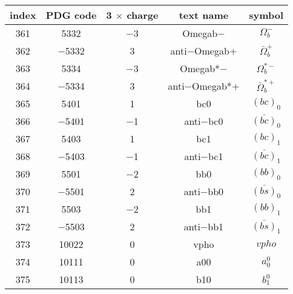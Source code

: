 \documentclass{article}
\begin{document}
\begin{table}[!htbp]
\centering
\begin{tabular}{|c|c|c|c|c|}
\hline
index & PDG code & 3 $\times$ charge & text name & symbol \\
\hline
361 & 5332 & $-$3 & Omega\underline{\hspace{0.6em}}b$-$ & $\Omega_{b}^{-}$ \\
\hline
362 & $-$5332 & 3 & anti$-$Omega\underline{\hspace{0.6em}}b$+$ & $\bar{\Omega}_{b}^{+}$ \\
\hline
363 & 5334 & $-$3 & Omega\underline{\hspace{0.6em}}b*$-$ & $\Omega_{b}^{*-}$ \\
\hline
364 & $-$5334 & 3 & anti$-$Omega\underline{\hspace{0.6em}}b*$+$ & $\bar{\Omega}_{b}^{*+}$ \\
\hline
365 & 5401 & 1 & bc\underline{\hspace{0.6em}}0 & $(bc)_{0}$ \\
\hline
366 & $-$5401 & $-$1 & anti$-$bc\underline{\hspace{0.6em}}0 & $\bar{(bc)}_{0}$ \\
\hline
367 & 5403 & 1 & bc\underline{\hspace{0.6em}}1 & $(bc)_{1}$ \\
\hline
368 & $-$5403 & $-$1 & anti$-$bc\underline{\hspace{0.6em}}1 & $\bar{(bc)}_{1}$ \\
\hline
369 & 5501 & $-$2 & bb\underline{\hspace{0.6em}}0 & $(bb)_{0}$ \\
\hline
370 & $-$5501 & 2 & anti$-$bb\underline{\hspace{0.6em}}0 & $\bar{(bs)}_{0}$ \\
\hline
371 & 5503 & $-$2 & bb\underline{\hspace{0.6em}}1 & $(bb)_{1}$ \\
\hline
372 & $-$5503 & 2 & anti$-$bb\underline{\hspace{0.6em}}1 & $\bar{(bs)}_{1}$ \\
\hline
373 & 10022 & 0 & vpho & $vpho$ \\
\hline
374 & 10111 & 0 & a\underline{\hspace{0.6em}}00 & $a_{0}^{0}$ \\
\hline
375 & 10113 & 0 & b\underline{\hspace{0.6em}}10 & $b_{1}^{0}$ \\

\end{tabular}
\end{table}
\end{document}
